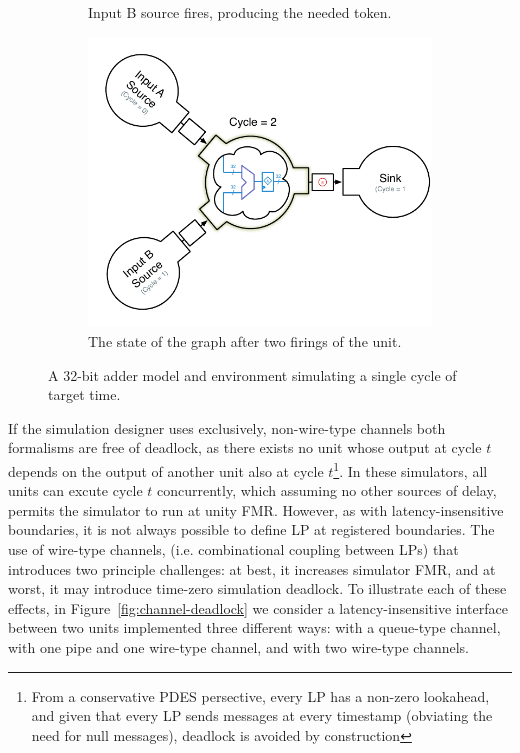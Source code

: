 \begin{figure}
\begin{subfigure}[t]{0.49\textwidth}
        \caption{Input B source fires, producing the needed token.}
    \end{subfigure}
    \begin{subfigure}[t]{0.49\textwidth}
        \includegraphics[width=\columnwidth]{figures/adder-example5.pdf}
        \caption{The state of the graph after two firings of the unit.}
    \end{subfigure}
    \centering
    \vspace{-0.25in}
    \caption{A 32-bit adder model and environment simulating a single cycle of target time.}
    \label{fig:adder-example}
\end{figure}

If the simulation designer uses exclusively, non-wire-type channels both
formalisms are free of deadlock, as there exists no unit whose output at cycle
$t$ depends on the output of another unit also at cycle $t$\footnote{From a
conservative PDES persective, every LP has a non-zero lookahead, and given that
every LP sends messages at every timestamp (obviating the need for null
messages), deadlock is avoided by construction}. In these simulators, all units
can excute cycle $t$ concurrently, which assuming no other sources of delay,
permits the simulator to run at unity FMR.  However, as with latency-insensitive boundaries, it is not always possible to define LP
at registered boundaries.  The use of wire-type channels, (i.e. combinational
coupling between LPs) that introduces two principle challenges: at best, it
increases simulator FMR, and at worst, it may introduce time-zero simulation
deadlock. To illustrate each of these effects, in Figure~\ref{fig:channel-deadlock} we consider a
latency-insensitive interface between two units implemented three different ways: with a queue-type
channel, with one pipe and one wire-type channel, and with two wire-type channels.

